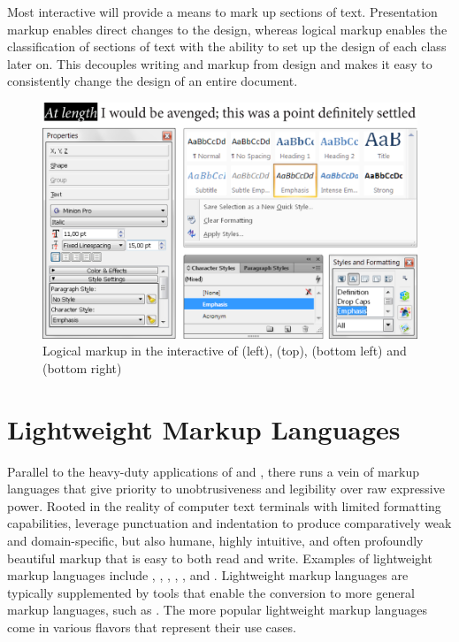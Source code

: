 Most interactive  will provide a means to mark up sections of text.
Presentation markup enables direct changes to the
design, whereas logical markup enables the classification
of sections of text with the ability to set up the design of each class later
on. This decouples writing and markup from design and makes it easy to
consistently change the design of an entire document.

\begin{figure}
  \includegraphics[width=\textwidth]{examples/02/interactive-editors.png}
  \caption{Logical markup in the interactive  of 
    (left),  (top),  (bottom left) and
     (bottom right)}
\end{figure}

\section{Lightweight Markup Languages}
Parallel to the heavy-duty applications of  and ,
there runs a vein of markup languages that give priority to unobtrusiveness and
legibility over raw expressive power. Rooted in the reality of computer text
terminals with limited formatting capabilities,  leverage punctuation and indentation to produce comparatively weak and
domain-specific, but also humane, highly intuitive, and often profoundly
beautiful markup that is easy to both read and write. Examples of lightweight
markup languages include , , ,
, , and .  Lightweight markup languages
are typically supplemented by tools that enable the conversion to more general
markup languages, such as . The more popular lightweight markup
languages come in various flavors that represent their use cases.
